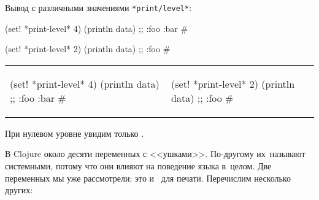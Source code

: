 \noindentnarrow
Вывод с различными значениями \texttt{*print\-/level*}:

\ifnarrow

\begin{clojure}
(set! *print-level* 4)
(println data)
;; {:foo {:bar #}}
\end{clojure}

\splitter

\begin{clojure}
(set! *print-level* 2)
(println data)
;; {:foo #}
\end{clojure}

\else

\noindent
\begin{tabular}{ @{}p{5cm} @{}p{5cm} }

\begin{clojure}
(set! *print-level* 4)
(println data)
;; {:foo {:bar #}}
\end{clojure}

&

\begin{clojure}
(set! *print-level* 2)
(println data)
;; {:foo #}
\end{clojure}

\end{tabular}

\fi

\noindent
При нулевом уровне увидим только \code{#}.

В Clojure около десяти переменных с <<ушками>>. По-другому их~называют
системными, потому что они влияют на поведение языка в~целом. Две переменных мы
уже рассмотрели: это  и~ для
печати. Перечислим несколько других:


